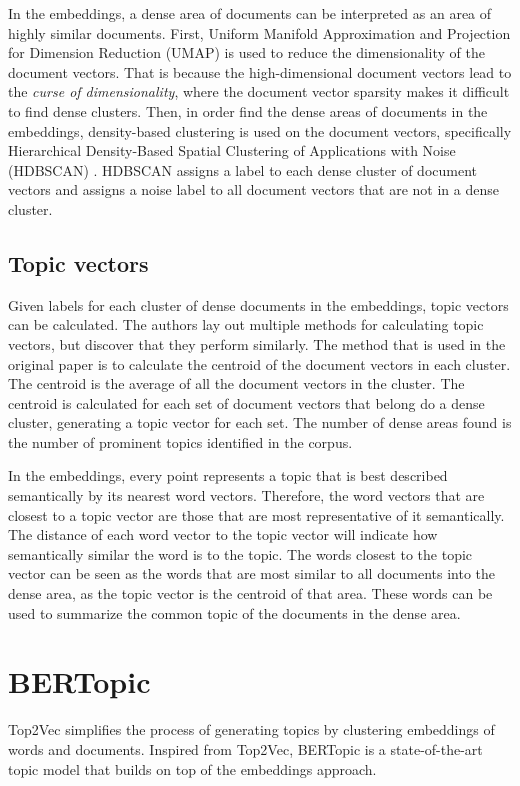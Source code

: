 In the embeddings, a dense area of documents can be interpreted as an area of highly similar documents. First, Uniform Manifold Approximation and Projection for Dimension Reduction (UMAP) \cite{mcinnes_umap_2020} is used to reduce the dimensionality of the document vectors. That is because the high-dimensional document vectors lead to the \textit{curse of dimensionality}, where the document vector sparsity makes it difficult to find dense clusters. Then, in order find the dense areas of documents in the embeddings, density-based clustering is used on the document vectors, specifically Hierarchical Density-Based Spatial Clustering of Applications with Noise (HDBSCAN) \cite{campello_density-based_2013, mcinnes_accelerated_2017, mcinnes_hdbscan_2017}. HDBSCAN assigns a label to each dense cluster of document vectors and assigns a noise label to all document vectors that are not in a dense cluster.


\subsection{Topic vectors}

Given labels for each cluster of dense documents in the embeddings, topic vectors can be calculated. The authors lay out multiple methods for calculating topic vectors, but discover that they perform similarly. The method that is used in the original paper is to calculate the centroid of the document vectors in each cluster. The centroid is the average of all the document vectors in the cluster. The centroid is calculated for each set of document vectors that belong do a dense cluster, generating a topic vector for each set. The number of dense areas found is the number of prominent topics identified in the corpus.

In the embeddings, every point represents a topic that is best described semantically by its nearest word vectors. Therefore, the word vectors that are closest to a topic vector are those that are most representative of it semantically. The distance of each word vector to the topic vector will indicate how semantically similar the word is to the topic. The words closest to the topic vector can be seen as the words that are most similar to all documents into the dense area, as the topic vector is the centroid of that area. These words can be used to summarize the common topic of the documents in the dense area.

\section{BERTopic}
\label{sec:bertopic}
Top2Vec simplifies the process of generating topics by clustering embeddings of words and documents. Inspired from Top2Vec, BERTopic \cite{grootendorst_bertopic_2022} is a state-of-the-art topic model that builds on top of the embeddings approach.

